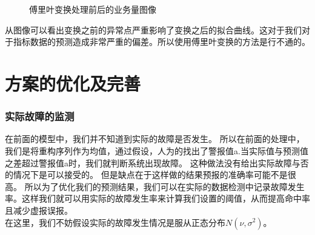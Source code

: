 \documentclass[a4paper]{article}
\begin{document}
\begin{figure}[h]
\begin{minipage}[t]{0.5\linewidth}
    \end{minipage}
	\caption{傅里叶变换处理前后的业务量图像}
     \label{fig:char}
\end{figure}
从图像可以看出变换之前的异常点严重影响了变换之后的拟合曲线。这对于我们对于指标数据的预测造成非常严重的偏差。所以使用傅里叶变换的方法是行不通的。

\part{方案的优化及完善}
\section{实际故障的监测}
\indent 在前面的模型中，我们并不知道到实际的故障是否发生。
所以在前面的处理中，我们是将重构序列作为均值，通过假设，人为的找出了警报值a.当实际值与预测值之差超过警报值a时，我们就判断系统出现故障。
这种做法没有给出实际故障与否的情况下是可以接受的。
但是缺点在于这样做的结果预报的准确率可能不是很高。
所以为了优化我们的预测结果，我们可以在实际的数据检测中记录故障发生率。这样我们就可以用实际的故障发生率来计算我们设置的阈值，从而提高命中率且减少虚报误报。\\
\indent 在这里，我们不妨假设实际的故障发生情况是服从正态分布$N(\nu,\sigma^2)$。\\
\indent 
\end{document}
